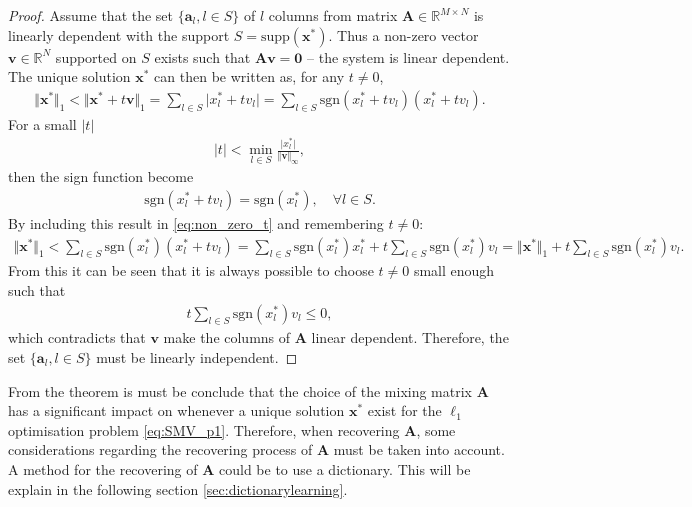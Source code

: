 \begin{proof}
Assume that the set $\lbrace \mathbf{a}_l, l \in S \rbrace$ of $l$ columns from matrix $\mathbf{A} \in \mathbb{R}^{M \times N}$ is linearly dependent with the support $S = \text{supp}(\mathbf{x}^\ast)$.
Thus a non-zero vector $\mathbf{v} \in \mathbb{R}^N$ supported on $S$ exists such that $\mathbf{Av} = \textbf{0}$ -- the system is linear dependent. The unique solution $\mathbf{x}^\ast$ can then be written as, for any $t \neq 0$,
\begin{align}\label{eq:non_zero_t}
\Vert \mathbf{x}^\ast \Vert_1 < \Vert \mathbf{x}^\ast + t \mathbf{v} \Vert_1 = \sum_{l \in S} \vert x_l^\ast + t v_l \vert = \sum_{l \in S} \text{sgn}(x_l^\ast + t v_l )(x_l^\ast + t v_l ).
\end{align}
For a small $|t|$
\begin{align*}
|t| < \min_{l \in S} \frac{\vert x_l^\ast \vert}{\Vert \mathbf{v} \Vert_{\infty}},
\end{align*}
then the sign function become
\begin{align*}
\text{sgn}(x_l^\ast + t v_l) = \text{sgn}(x_l^\ast), \quad \forall l \in S.
\end{align*}
By including this result in \eqref{eq:non_zero_t} and remembering $t \neq 0$:
\begin{align*}
\Vert \textbf{x}^{\ast} \Vert_1 < \sum_{l \in S} \text{sgn}(x_l^{\ast})(x_l^{\ast} + t v_l ) = \sum_{l \in S} \text{sgn}(x_l^{\ast})x_l^{\ast} + t \sum_{l \in S} \text{sgn}(x_l^{\ast})v_l = \Vert \textbf{x}^{\ast} \Vert_1 + t \sum_{l \in S} \text{sgn}(x_l^{\ast})v_l.
\end{align*}
From this it can be seen that it is always possible to choose $t \neq 0$ small enough such that 
\begin{align*}
t \sum_{l \in S} \text{sgn}(x_l^\ast)v_l \leq 0,
\end{align*}
which contradicts that $\mathbf{v}$ make the columns of $\mathbf{A}$ linear dependent. 
Therefore, the set $\lbrace \mathbf{a}_l, l \in S \rbrace$ must be linearly independent.
\end{proof}
From the theorem is must be conclude that the choice of the mixing matrix $\mathbf{A}$ has a significant impact on whenever a unique solution $\mathbf{x}^\ast$ exist for the $\ell_1$ optimisation problem \eqref{eq:SMV_p1}. Therefore, when recovering $\mathbf{A}$, some considerations regarding the recovering process of $\mathbf{A}$ must be taken into account. A method for the recovering of $\mathbf{A}$ could be to use a dictionary. This will be explain in the following section \ref{sec:dictionarylearning}.

